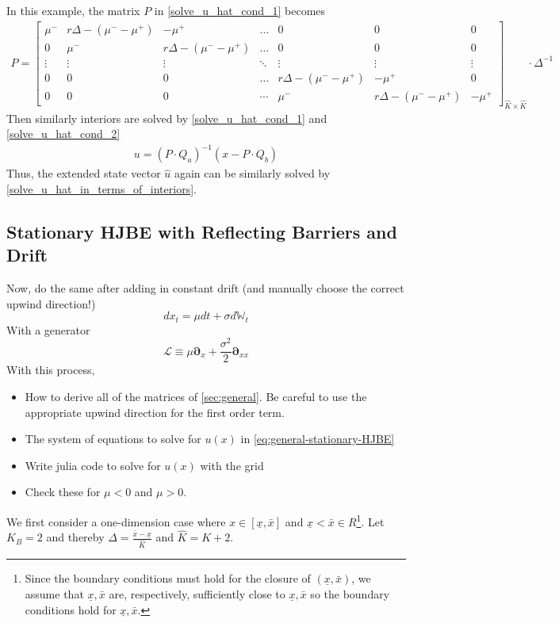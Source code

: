 \documentclass[11pt]{article}
\newcommand{\D}[1][]{\ensuremath{\boldsymbol{\partial}_{#1}}}
\newcommand{\W}{\ensuremath{\mathbb{W}}}
\begin{document}
In this example, the matrix $P$ in \eqref{solve_u_hat_cond_1} becomes
\begin{align}
P = \begin{bmatrix}
\mu^-&r\Delta-(\mu^--\mu^+)&-\mu^+&\dots&0&0&0\\
0&\mu^-&r\Delta-(\mu^--\mu^+)&\dots&0&0&0\\
\vdots&\vdots&\vdots&\ddots&\vdots&\vdots&\vdots\\
0&0&0&\dots&r\Delta-(\mu^--\mu^+)&-\mu^+&0\\
0&0&0&\cdots&\mu^-&r\Delta-(\mu^--\mu^+)&-\mu^+
\end{bmatrix}_{\hat{K}\times\hat{K}}\cdot \Delta^{-1}
\end{align}
Then similarly interiors are solved by \eqref{solve_u_hat_cond_1} and \eqref{solve_u_hat_cond_2} 
\begin{align}
u = (P\cdot Q_a)^{-1}(x-P\cdot Q_b)
\end{align}
Thus, the extended state vector $\hat{u}$ again can be similarly solved by \eqref{solve_u_hat_in_terms_of_interiors}.

\subsection{Stationary HJBE with Reflecting Barriers and Drift}
Now, do the same after adding in constant drift (and manually choose the correct upwind direction!)
$$
d x_t = \mu dt + \sigma d\W_t
$$
With a generator
$$
	\mathcal{L} \equiv \mu \D[x] + \frac{\sigma^2}{2}\D[xx]
$$
With this process,
\begin{itemize}
	\item How to derive all of the matrices of \cref{sec:general}.  Be careful to use the appropriate upwind direction for the first order term.
	\item The system of equations to solve for $u(x)$ in \cref{eq:general-stationary-HJBE}
	\item Write julia code to solve for $u(x)$ with the grid
	\item Check these for $\mu < 0$ and $\mu > 0$.
\end{itemize}

We first consider a one-dimension case where $x\in [\underline{\textit{\~{x}}}, \bar{\textit{\~{x}}}]$ and $\underline{\textit{\~{x}}} < \bar{\textit{\~{x}}} \in R$\footnote{Since the boundary conditions must hold for the closure of $(\underline{x},\bar{x})$, we assume that $\underline{\textit{\~{x}}}, \bar{\textit{\~{x}}}$ are, respectively, sufficiently close to $\underline{x}, \bar{x}$ so the boundary conditions hold for $\underline{\textit{\~{x}}}, \bar{\textit{\~{x}}}$.}. Let $K_B = 2$ and thereby $\Delta  = \frac{\bar{\textit{\~{x}}} - \underline{\textit{\~{x}}}}{\hat{K}}$ and $\hat{K} = K+2$. 
\end{document}
